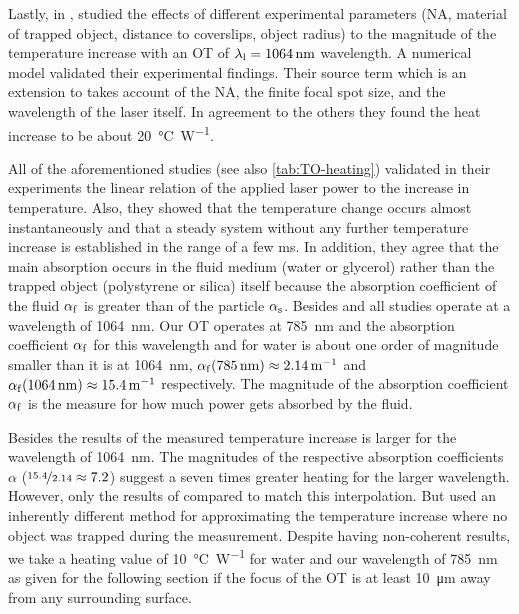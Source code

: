 Lastly, in \citeyear{Catala2017},  studied the effects of 
different experimental parameters (NA, material of trapped object, distance to 
coverslips, object radius) to the magnitude of the temperature increase with an 
OT of $\lal=\SI{1064}{\nm}$ wavelength. A numerical model validated their 
experimental findings. Their source term which is an extension to 
 takes account of the NA, the finite focal spot size, and 
the wavelength of the laser itself. In agreement to the others they found the 
heat increase to be about \SI{20}{\degreeCelsius\per\watt}.

All of the aforementioned studies (see also \cref{tab:TO-heating}) validated in 
their experiments the linear relation of the applied laser power to the 
increase in temperature. Also, they showed that the temperature change occurs 
almost instantaneously and that a steady system without any further temperature 
increase is established in the range of a few \si{\ms}. In addition, they agree 
that the main absorption occurs in the fluid medium (water or glycerol) rather 
than the trapped object (polystyrene or silica) itself because the absorption 
coefficient of the fluid $\alpha_{\mathrm{f}}$ is greater than of the particle 
$\alpha_{\mathrm{s}}$. Besides  and  all 
studies operate at a wavelength of \SI{1064}{\nm}. Our OT operates at 
\SI{785}{\nm} and the absorption coefficient $\alpha_{\mathrm{f}}$ for this 
wavelength and for water is about one order of magnitude smaller than it is at 
\SI{1064}{\nm},
$\alpha_{\MR{f}}(\SI{785}{\nm}) \approx \SI{2.14}{\per\meter} $ and 
$\alpha_{\MR{f}}(\SI{1064}{\nm}) \approx \SI{15.4}{\per\meter} $ respectively. 
The magnitude of the absorption coefficient $\alpha_{\mathrm{f}}$ is the measure 
for how much power gets absorbed by the fluid.

Besides the results of  the measured temperature increase 
is larger for the wavelength of \SI{1064}{\nm}. The magnitudes of the 
respective absorption coefficients $\alpha$ ($\nicefrac{15.4}{2.14}\approx 
7.2$) suggest a seven times greater heating for the larger wavelength. However, 
only the results of  compared to  match 
this interpolation. But  used an inherently different 
method for approximating the temperature increase where no object was trapped 
during the measurement. Despite having non-coherent results, we take a heating 
value of \SI{10}{\degreeCelsius\per\watt} for water and our wavelength of 
\SI{785}{\nm} as given for the following section if the focus of the OT is at 
least \SI{10}{\um} away from any surrounding surface.

